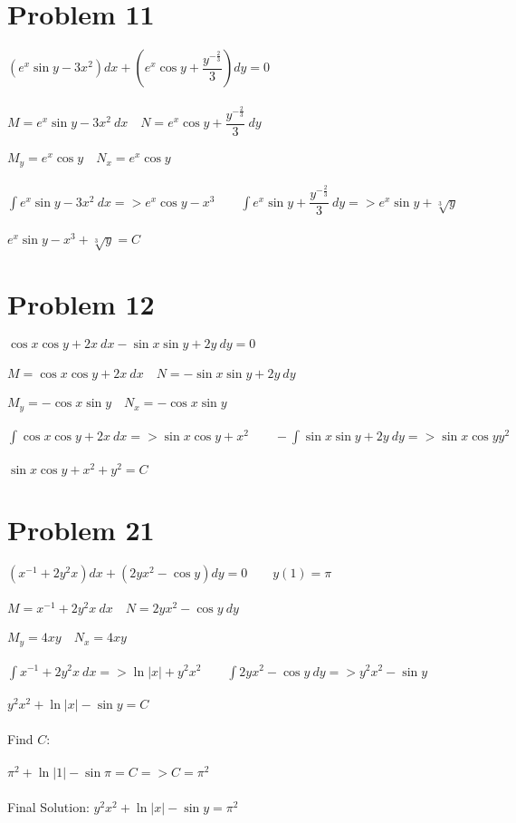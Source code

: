 \documentclass[12pt]{exam}
\begin{document}
\section*{Problem 11}
$(e^x\sin{y}-3x^2)dx+\left(e^x\cos{y}+\dfrac{y^{-\frac{2}{3}}}{3}\right)dy=0$\\\\
$M=e^x\sin{y}-3x^2\:dx\quad N=e^x\cos{y}+\dfrac{y^{-\frac{2}{3}}}{3}\:dy$\\\\
$M_y=e^x\cos{y}\quad N_x=e^x\cos{y}$\\\\
$\int e^x\sin{y}-3x^2\:dx=>e^x\cos{y}-x^3\qquad\int e^x\sin{y}+\dfrac{y^{-\frac{2}{3}}}{3}\:dy=>e^x\sin{y}+\sqrt[3]{y}$\\\\
$e^x\sin{y}-x^3+\sqrt[3]{y}=C$
\section*{Problem 12}
$\cos{x}\cos{y}+2x\:dx-\sin{x}\sin{y}+2y\:dy=0$\\\\
$M=\cos{x}\cos{y}+2x\:dx\quad N=-\sin{x}\sin{y}+2y\:dy$\\\\
$M_y=-\cos{x}\sin{y}\quad N_x=-\cos{x}\sin{y}$\\\\
$\int\cos{x}\cos{y}+2x\:dx=>\sin{x}\cos{y}+x^2\qquad-\int\sin{x}\sin{y}+2y\:dy=>\sin{x}\cos{y}y^2$\\\\
$\sin{x}\cos{y}+x^2+y^2=C$
\section*{Problem 21}
$(x^{-1}+2y^2x)dx+(2yx^2-\cos{y})dy=0\qquad y(1)=\pi$\\\\
$M=x^{-1}+2y^2x\:dx\quad N=2yx^2-\cos{y}\:dy$\\\\
$M_y=4xy\quad N_x=4xy$\\\\
$\int x^{-1}+2y^2x\:dx=>\ln{|x|}+y^2x^2\qquad\int2yx^2-\cos{y}\:dy=>y^2x^2-\sin{y}$\\\\
$y^2x^2+\ln{|x|}-\sin{y}=C$\\\\
Find $C$:\\\\
$\pi^2+\ln{|1|}-\sin{\pi}=C=>C=\pi^2$\\\\
Final Solution: $y^2x^2+\ln{|x|}-\sin{y}=\pi^2$
\end{document}
